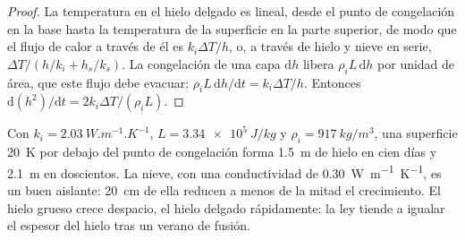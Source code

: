 \begin{proof}
La temperatura en el hielo delgado es lineal, desde el punto de congelación en la base
hasta la temperatura de la superficie en la parte superior, de modo que el flujo de calor a través de él es
$k_i\Delta T/h$, o, a través de hielo y nieve en serie, $\Delta T/(h/k_i +
h_s/k_s)$. La congelación de una capa $\mathrm dh$ libera $\rho_iL\,\mathrm dh$ por
unidad de área, que este flujo debe evacuar: $\rho_iL\,\mathrm dh/\mathrm dt
= k_i\Delta T/h$. Entonces $\mathrm d(h^2)/\mathrm dt = 2k_i\Delta T/(\rho_iL)$.
\end{proof}

Con $k_i = \qty{2.03}{W.m^{-1}.K^{-1}}$, $L = \qty{3.34e5}{J/kg}$ y
$\rho_i = \qty{917}{kg/m^3}$, una superficie \qty{20}{K} por debajo del punto de congelación
forma \qty{1.5}{m} de hielo en cien días y \qty{2.1}{m} en doscientos.
La nieve, con una conductividad de \qty{0.30}{W.m^{-1}.K^{-1}}, es un buen
aislante: \qty{20}{cm} de ella reducen a menos de la mitad el crecimiento. El hielo grueso crece
despacio, el hielo delgado rápidamente: la ley tiende a igualar el espesor del hielo
tras un verano de fusión.

